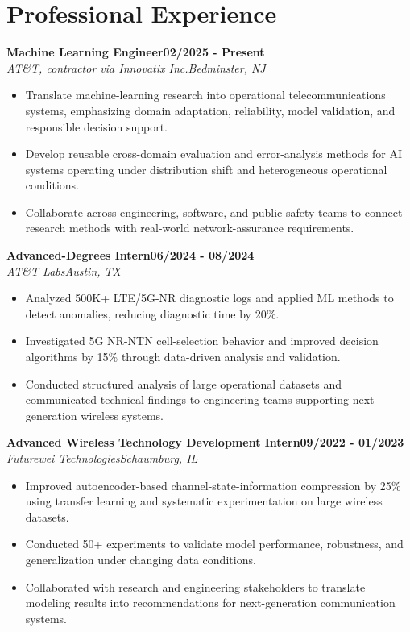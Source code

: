 \documentclass[9pt,letterpaper]{extarticle}
\newcommand{\role}[4]{%
  \Needspace{4\baselineskip}\textbf{#1}\hfill\textbf{#2}\\[-1pt]
  \textit{#3}\hfill\textit{#4}\par}
\begin{document}
\section{Professional Experience}
\role{Machine Learning Engineer}{02/2025 - Present}{AT\&T, contractor via Innovatix Inc.}{Bedminster, NJ}
\begin{itemize}
\item Translate machine-learning research into operational telecommunications systems, emphasizing domain adaptation, reliability, model validation, and responsible decision support.
\item Develop reusable cross-domain evaluation and error-analysis methods for AI systems operating under distribution shift and heterogeneous operational conditions.
\item Collaborate across engineering, software, and public-safety teams to connect research methods with real-world network-assurance requirements.
\end{itemize}
\role{Advanced-Degrees Intern}{06/2024 - 08/2024}{AT\&T Labs}{Austin, TX}
\begin{itemize}
\item Analyzed 500K+ LTE/5G-NR diagnostic logs and applied ML methods to detect anomalies, reducing diagnostic time by 20\%.
\item Investigated 5G NR-NTN cell-selection behavior and improved decision algorithms by 15\% through data-driven analysis and validation.
\item Conducted structured analysis of large operational datasets and communicated technical findings to engineering teams supporting next-generation wireless systems.
\end{itemize}
\role{Advanced Wireless Technology Development Intern}{09/2022 - 01/2023}{Futurewei Technologies}{Schaumburg, IL}
\begin{itemize}
\item Improved autoencoder-based channel-state-information compression by 25\% using transfer learning and systematic experimentation on large wireless datasets.
\item Conducted 50+ experiments to validate model performance, robustness, and generalization under changing data conditions.
\item Collaborated with research and engineering stakeholders to translate modeling results into recommendations for next-generation communication systems.
\end{itemize}
\end{document}

